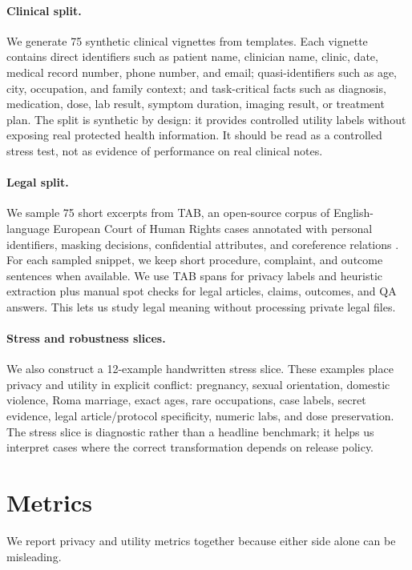 \documentclass{article}
\begin{document}
\paragraph{Clinical split.}
We generate 75 synthetic clinical vignettes from templates.  Each vignette
contains direct identifiers such as patient name, clinician name, clinic, date,
medical record number, phone number, and email; quasi-identifiers such as age,
city, occupation, and family context; and task-critical facts such as diagnosis,
medication, dose, lab result, symptom duration, imaging result, or treatment
plan.  The split is synthetic by design: it provides controlled utility labels
without exposing real protected health information.  It should be read as a
controlled stress test, not as evidence of performance on real clinical notes.

\paragraph{Legal split.}
We sample 75 short excerpts from TAB, an open-source corpus of English-language
European Court of Human Rights cases annotated with personal identifiers, masking
decisions, confidential attributes, and coreference relations \cite{pilan2022tab}.
For each sampled snippet, we keep short procedure, complaint, and outcome
sentences when available.  We use TAB spans for privacy labels and heuristic
extraction plus manual spot checks for legal articles, claims, outcomes, and QA
answers.  This lets us study legal meaning without processing private legal
files.

\paragraph{Stress and robustness slices.}
We also construct a 12-example handwritten stress slice.  These examples place
privacy and utility in explicit conflict: pregnancy, sexual orientation,
domestic violence, Roma marriage, exact ages, rare occupations, case labels,
secret evidence, legal article/protocol specificity, numeric labs, and dose
preservation.  The stress slice is diagnostic rather than a headline benchmark;
it helps us interpret cases where the correct transformation depends on release
policy.

\section{Metrics}

We report privacy and utility metrics together because either side alone can be
misleading.
\end{document}
